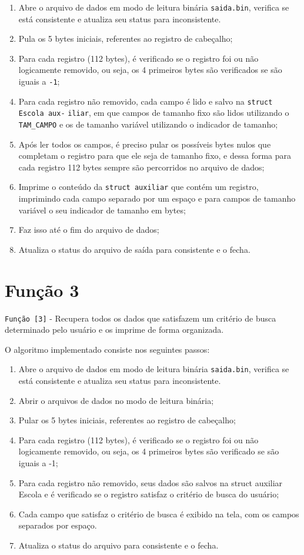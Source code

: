 \documentclass[
	12pt,				%
	openany,			%
	twoside,			%
	a4paper,			%
	english,			%
	french,				%
	spanish,			%
	brazil,				%
]{abntex2}
\begin{document}
		\begin{enumerate}
			\item Abre o arquivo de dados em modo de leitura binária \verb|saida.bin|, verifica se está consistente e atualiza seu status para inconsistente.
			\item Pula os 5 bytes iniciais, referentes ao registro de cabeçalho;
			\item Para cada registro (112 bytes), é verificado se o registro foi ou não logicamente removido, ou seja, os 4 primeiros bytes são verificados se são iguais a \verb|-1|;
			\item Para cada registro não removido, cada campo é lido e salvo na \verb|struct Escola aux-| \verb|iliar|, em que campos de tamanho fixo são lidos utilizando o \verb|TAM_CAMPO| e os de tamanho variável utilizando o indicador de tamanho;
			\item Após ler todos os campos, é preciso pular os possíveis bytes nulos que completam o registro para que ele seja de tamanho fixo, e dessa forma para cada registro 112 bytes sempre são percorridos no arquivo de dados;
			\item Imprime o conteúdo da \verb|struct auxiliar| que contém um registro, imprimindo cada campo separado por um espaço e para campos de tamanho variável o seu indicador de tamanho em bytes;
			\item Faz isso até o fim do arquivo de dados;
			\item Atualiza o status do arquivo de saída para consistente e o fecha.
		\end{enumerate}

	\section{Função 3}

		\verb|Função [3]| - Recupera todos os dados que satisfazem um critério de busca determinado pelo usuário e os imprime de forma organizada.

		O algoritmo implementado consiste nos seguintes passos:

		\begin{enumerate}
			\item Abre o arquivo de dados em modo de leitura binária \verb|saida.bin|, verifica se está consistente e atualiza seu status para inconsistente.
			\item Abrir o arquivos de dados no modo de leitura binária;
			\item Pular os 5 bytes iniciais, referentes ao registro de cabeçalho;
			\item Para cada registro (112 bytes), é verificado se o registro foi ou não logicamente removido, ou seja, os 4 primeiros bytes são verificado se são iguais a -1;
			\item Para cada registro não removido, seus dados são salvos na struct auxiliar Escola e é verificado se o registro satisfaz o critério de busca do usuário;
			\item  Cada campo que satisfaz o critério de busca é exibido na tela, com os campos separados por espaço.
			\item Atualiza o status do arquivo para consistente e o fecha.
		\end{enumerate}
\end{document}
